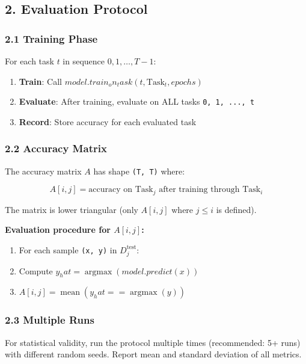 \documentclass[11pt]{article}
\begin{document}
\subsection{2. Evaluation Protocol}

\subsubsection{2.1 Training Phase}

For each task $t$ in sequence $0, 1, \ldots, T-1$:

\begin{enumerate}[leftmargin=*]
\item \textbf{Train}: Call $model.train_on_task(t, \mathrm{Task}_t, epochs)$
\item \textbf{Evaluate}: After training, evaluate on ALL tasks \texttt{0, 1, ..., t}
\item \textbf{Record}: Store accuracy for each evaluated task
\end{enumerate}

\subsubsection{2.2 Accuracy Matrix}

The accuracy matrix $A$ has shape \texttt{(T, T)} where:

\[
A[i, j] = \text{accuracy on } \mathrm{Task}_j \text{ after training through } \mathrm{Task}_i
\]

The matrix is lower triangular (only $A[i, j]$ where $j \le  i$ is defined).

\textbf{Evaluation procedure for $A[i, j]$:}

\begin{enumerate}[leftmargin=*]
\item For each sample \texttt{(x, y)} in $D_j^{\mathrm{test}}$:
\item Compute $y_hat = \operatorname{argmax}(model.predict(x))$
\item $A[i, j] = \operatorname{mean}(y_hat == \operatorname{argmax}(y))$
\end{enumerate}

\subsubsection{2.3 Multiple Runs}

For statistical validity, run the protocol multiple times (recommended: 5+ runs) with different random seeds. Report mean and standard deviation of all metrics.
\end{document}
